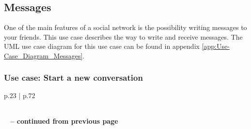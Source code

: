 \documentclass[11pt,a4paper]{report}
\begin{document}
\subsection{Messages}
One of the main features of a social network is the possibility writing messages to your friends. This use case describes the way to write and receive messages. The UML use case diagram for this use case can be found in appendix \vref{app:Use-Case_Diagram_Messages}.

\subsubsection{Use case: Start a new conversation}

\begin{longtable}{p{} | p{}}
    \caption{Use case: Start a new conversation} \label{tab:ucStartConv} \\
    \endfirsthead
        {{\bfseries \tablename\ \thetable{} -- continued from previous page}} \\
         \\
    \endhead
         \\ 
    \endfoot
    \endlastfoot
    

\end{longtable}
\end{document}
